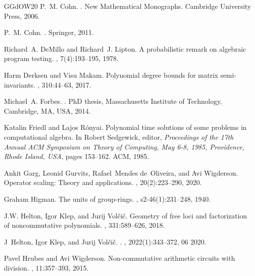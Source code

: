 \documentclass[10pt,a4paper]{article}
\begin{document}
\begin{thebibliography}{GGdOW20}
P.~M. Cohn.
.
\newblock New Mathematical Monographs. Cambridge University Press, 2006.

P.~M. Cohn.
.
\newblock Springer, 2011.

Richard~A. DeMillo and Richard~J. Lipton.
\newblock A probabilistic remark on algebraic program testing.
, 7(4):193--195, 1978.

Harm Derksen and Visu Makam.
\newblock Polynomial degree bounds for matrix semi-invariants.
, 310:44--63, 2017.

Michael~A. Forbes.
.
\newblock PhD thesis, Massachusetts Institute of Technology, Cambridge, MA,
  {USA}, 2014.

Katalin Friedl and Lajos R{\'{o}}nyai.
\newblock Polynomial time solutions of some problems in computational algebra.
\newblock In Robert Sedgewick, editor, {\em Proceedings of the 17th Annual
  {ACM} Symposium on Theory of Computing, May 6-8, 1985, Providence, Rhode
  Island, {USA}}, pages 153--162. {ACM}, 1985.

Ankit Garg, Leonid Gurvits, Rafael~Mendes de~Oliveira, and Avi Wigderson.
\newblock Operator scaling: Theory and applications.
, 20(2):223--290, 2020.

Graham Higman.
\newblock The units of group-rings.
,
  s2-46(1):231--248, 1940.

J.W. Helton, Igor Klep, and Jurij Volčič.
\newblock Geometry of free loci and factorization of noncommutative
  polynomials.
, 331:589--626, 2018.

J~Helton, Igor Klep, and Jurij Volčič.
.
, 2022(1):343--372,
  06 2020.

Pavel Hrubes and Avi Wigderson.
\newblock Non-commutative arithmetic circuits with division.
, 11:357--393, 2015.


\end{thebibliography}
\end{document}
